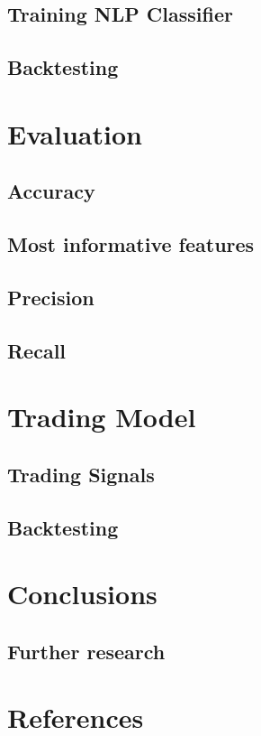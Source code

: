 \documentclass[twocolumn]{article}
\begin{document}
\subsection{Training NLP Classifier}
\subsection{Backtesting}
\section{Evaluation}
\subsection{Accuracy}

\subsection{Most informative features}

\subsection{Precision}

\subsection{Recall}

\section{Trading Model}
\subsection{Trading Signals}
\subsection{Backtesting}
\section{Conclusions}
\subsection{Further research}

\section{References}
\end{document}
